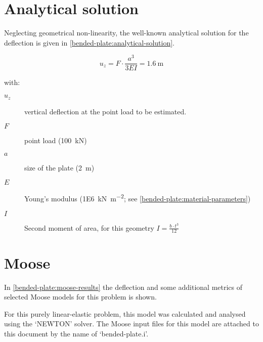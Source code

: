 \section{Analytical solution}
\label{bended-plate:sec:analytical-solution}

Neglecting geometrical non-linearity, the well-known analytical solution for
the deflection is given in \autoref{bended-plate:analytical-solution}.

\begin{equation}
    \label{bended-plate:analytical-solution}
    u_z = F \cdot \frac{a ^ 3}{3EI} = \qty{1.6}{\metre}
\end{equation}

\begin{samepage}
    with:
    \begin{description}
        \item[$u_{z}$] vertical deflection at the point load to be estimated.
        \item[$F$] point load (\qty{100}{\kilo\newton})
        \item[$a$] size of the plate (\qty{2}{\metre})
        \item[$E$] Young's modulus (\qty[per-mode = symbol]{1E6}{\kilo\newton\per\square\metre}; see \autoref{bended-plate:material-parameters})
        \item[$I$] Second moment of area, for this geometry $I = \frac{b \cdot t^3}{12}$
    \end{description}
\end{samepage}

\section{Moose}
\label{bended-plate:sec:moose}

In \autoref{bended-plate:moose-results} the deflection and some additional
metrics of selected Moose models for this problem is shown.

For this purely linear-elastic problem, this model was calculated and analysed
using the ‘NEWTON’ solver. The Moose input files for this model are attached to
this document by the name of ‘bended-plate.i’.



